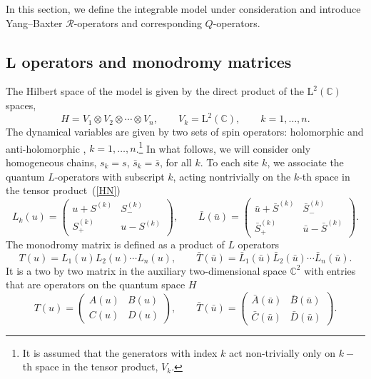 \documentclass[10pt,a4paper]{amsart}
\numberwithin{equation}{section}
\begin{document}
In this section, we define the integrable model under
consideration and introduce Yang--Baxter $\mathcal{R}$-operators
and corresponding $Q$-operators.

\subsection[L operators and monodromy matrices]{$\boldsymbol{L}$ operators and monodromy matrices}

The Hilbert space of the model is given by the direct product of the $\mathrm{L}^2(\mathbb{C})$ spaces,
\begin{equation}\label{HN}
H=V_1\otimes V_2\otimes\cdots\otimes V_n, \qquad V_k=\mathrm{L}^2(\mathbb{C}) ,\qquad
k=1,\dots,n.
\end{equation}
The dynamical variables are given by two sets of spin operators: holomorphic
 and anti-holomorphic
,
$k=1,\dots,n$.\footnote{It is assumed that the
generators with index $k$ act non-trivially
only on $k-$th space in the tensor product, $V_k$.}
In what follows, we will consider only homogeneous chains, $s_k=s$, $\bar s_k=\bar s$, for all $k$.
To each site $k$, we associate the quantum $L$-operators
with subscript $k$, acting nontrivially on the $k$-th space in the tensor product~(\ref{HN})
\begin{equation*}
L_k(u) =
\begin{pmatrix}
u + S^{(k)} & S_{-}^{(k)} \\
S_{+}^{(k)} & u - S^{(k)} \end{pmatrix}, \qquad
\bar L(\bar u) = \begin{pmatrix}
\bar u + \bar S^{(k)} & \bar S_{-}^{(k)}\\
\bar S_{+}^{(k)}& \bar u - \bar S^{(k)}
\end{pmatrix}.
\end{equation*}
The monodromy matrix is defined as a product of $L$ operators
\begin{equation*}
T(u)=L_1(u)L_2(u)\cdots L_n(u), \qquad
 \bar T(\bar u)=\bar L_1(\bar u)\bar L_2(\bar u)\cdots \bar L_n(\bar u) .
\end{equation*}
It is a two by two matrix in the auxiliary two-dimensional space
$\mathbb{C}^2$ with entries that are operators on the quantum space $H$
\begin{equation*}
T(u)
=\begin{pmatrix}
A(u)& B(u)\\
C(u)& D(u)
\end{pmatrix},\qquad
\bar T(\bar u)
 =\begin{pmatrix}
\bar A(\bar u)& \bar B(\bar u)\\
\bar C(\bar u)& \bar D(\bar u)
\end{pmatrix} .
\end{equation*}
\end{document}
